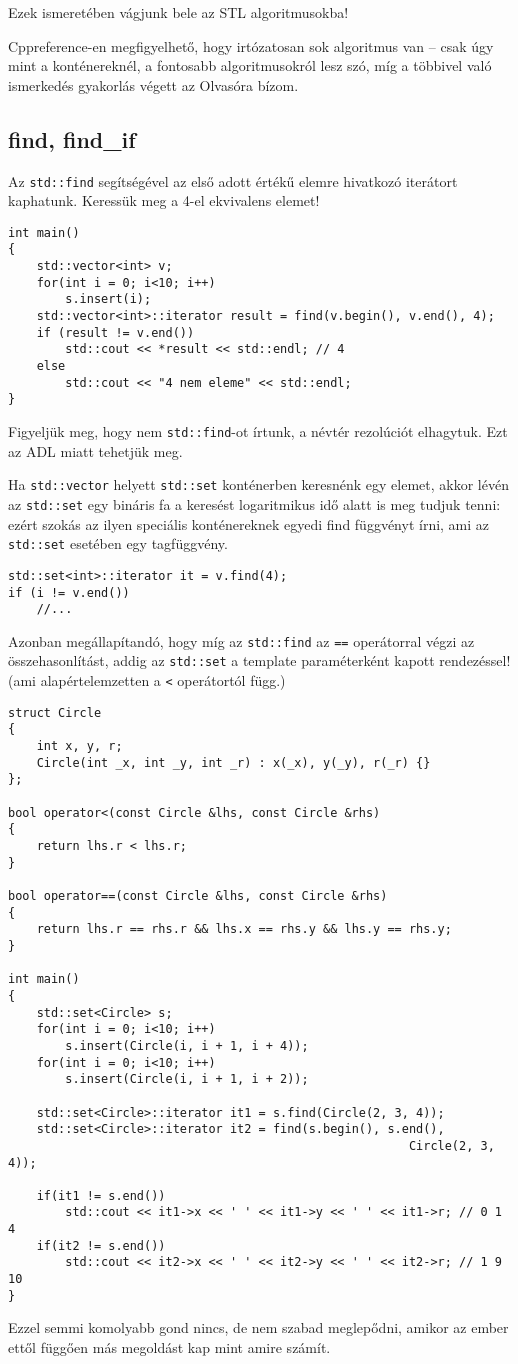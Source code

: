 \documentclass[../cpp_book/cpp_book.tex]{subfiles}
\begin{document}
	Ezek ismeretében vágjunk bele az STL algoritmusokba!
	\begin{note}
		Cppreference-en megfigyelhető, hogy irtózatosan sok algoritmus van -- csak úgy mint a konténereknél, a fontosabb algoritmusokról lesz szó, míg a többivel való ismerkedés gyakorlás végett az Olvasóra bízom.
	\end{note}
	\subsection{find, find\_if}
	Az \texttt{std::find} segítségével az első adott értékű elemre hivatkozó iterátort kaphatunk. Keressük meg a 4-el ekvivalens elemet!
	\begin{lstlisting}
int main()
{
	std::vector<int> v;
	for(int i = 0; i<10; i++)
		s.insert(i);
	std::vector<int>::iterator result = find(v.begin(), v.end(), 4);
	if (result != v.end())
		std::cout << *result << std::endl; // 4
	else
		std::cout << "4 nem eleme" << std::endl;
}
	\end{lstlisting}
	\begin{note}
		Figyeljük meg, hogy nem \texttt{std::find}-ot írtunk, a névtér rezolúciót elhagytuk. Ezt az ADL miatt tehetjük meg.
	\end{note}
	Ha \texttt{std::vector} helyett \texttt{std::set} konténerben keresnénk egy elemet, akkor lévén az \texttt{std::set} egy bináris fa a keresést logaritmikus idő alatt is meg tudjuk tenni: ezért szokás az ilyen speciális konténereknek egyedi find függvényt írni, ami az \texttt{std::set} esetében egy tagfüggvény. 
	\begin{lstlisting}
std::set<int>::iterator it = v.find(4);
if (i != v.end())
	//...
	\end{lstlisting}
	Azonban megállapítandó, hogy míg az \texttt{std::find} az \texttt{==} operátorral végzi az összehasonlítást, addig az \texttt{std::set} a template paraméterként kapott rendezéssel! (ami alapértelemzetten a \texttt{<} operátortól függ.)
\begin{lstlisting}
struct Circle
{
	int x, y, r;
	Circle(int _x, int _y, int _r) : x(_x), y(_y), r(_r) {}
};

bool operator<(const Circle &lhs, const Circle &rhs)
{
	return lhs.r < lhs.r;
}

bool operator==(const Circle &lhs, const Circle &rhs)
{
	return lhs.r == rhs.r && lhs.x == rhs.y && lhs.y == rhs.y;
}

int main()
{
	std::set<Circle> s;
	for(int i = 0; i<10; i++)
		s.insert(Circle(i, i + 1, i + 4));
	for(int i = 0; i<10; i++)
		s.insert(Circle(i, i + 1, i + 2));
	
	std::set<Circle>::iterator it1 = s.find(Circle(2, 3, 4));
	std::set<Circle>::iterator it2 = find(s.begin(), s.end(), 
														Circle(2, 3, 4));
	
	if(it1 != s.end())
		std::cout << it1->x << ' ' << it1->y << ' ' << it1->r; // 0 1 4
	if(it2 != s.end())
		std::cout << it2->x << ' ' << it2->y << ' ' << it2->r; // 1 9 10
}
\end{lstlisting}
	Ezzel semmi komolyabb gond nincs, de nem szabad meglepődni, amikor az ember ettől függően más megoldást kap mint amire számít.
	
\end{document}
